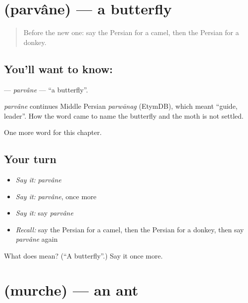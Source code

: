 \section[\texorpdfstring{\fa{پروانه} (parvâne)}{پروانه (parvâne)}]{ (parvâne) — a butterfly}

\label{lesson:FA-C57-parvane}



\begin{quote}
Before the new one: say the Persian for a camel, then the Persian for a donkey.
\end{quote}

\subsection*{You'll want to know: }
\textbf{} — \emph{parvâne} — \textquotedblleft{}a butterfly\textquotedblright{}.

\begin{cousinweb}
\emph{parvâne} continues Middle Persian \emph{parwānag} (EtymDB), which meant \textquotedblleft{}guide, leader\textquotedblright{}. How the word came to name the butterfly and the moth is not settled.
\end{cousinweb}

\begin{grammarlens}[title={What you've built}]
One more word for this chapter.
\end{grammarlens}

\subsection*{Your turn}
\begin{itemize}
\raggedright
  \item \emph{Say it:} \emph{parvâne}
  \item \emph{Say it:} \emph{parvâne}, once more
  \item \emph{Say it:} say \emph{parvâne}
  \item \emph{Recall:} say the Persian for a camel, then the Persian for a donkey, then say \emph{parvâne} again
\end{itemize}

\begin{tcolorbox}[breakable,colback=teal!4,colframe=teal!35!black,title={Before you move on}]
What does  mean? (\textquotedblleft{}A butterfly\textquotedblright{}.) Say it once more.
\end{tcolorbox}
\section[\texorpdfstring{\fa{مورچه} (murche)}{مورچه (murche)}]{ (murche) — an ant}

